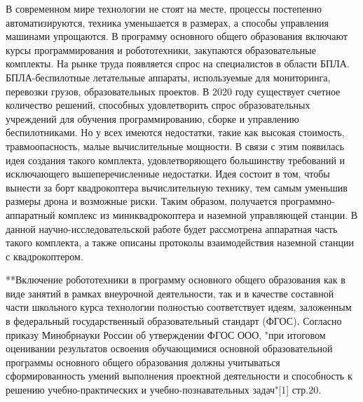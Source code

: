 В современном мире технологии не стоят на месте, процессы постепенно автоматизируются, техника уменьшается в размерах, а способы управления машинами упрощаются. В программу основного общего образования включают курсы программирования и робототехники, закупаются образовательные комплекты. На рынке труда появляется спрос на специалистов в области БПЛА. БПЛА-беспилотные летательные аппараты, используемые для мониторинга, перевозки грузов, образовательных проектов. В 2020 году существует счетное количество решений, способных удовлетворить спрос образовательных учреждений для обучения программированию, сборке и управлению беспилотниками. Но у всех имеются недостатки, такие как высокая стоимость, травмоопасность, малые вычислительные мощности. В связи с этим появилась идея создания такого комплекта, удовлетворяющего большинству требований и исключающего вышеперечисленные недостатки. Идея состоит в том, чтобы вынести за борт квадрокоптера вычислительную технику, тем самым уменьшив размеры дрона и возможные риски. Таким образом, получается программно-аппаратный комплекс из миниквадрокоптера и наземной управляющей станции. 
В данной научно-исследовательской работе будет рассмотрена аппаратная часть такого комплекта, а также описаны протоколы взаимодействия наземной станции с квадрокоптером.


**Включение робототехники в программу основного общего образования как в виде занятий в рамках внеурочной деятельности, так и в качестве составной части школьного курса технологии полностью соответствует идеям, заложенным в федеральный государственный образовательный стандарт (ФГОС). Согласно приказу Минобрнауки России об утверждении ФГОС ООО, "при итоговом оценивании результатов освоения обучающимися основной образовательной программы основного общего образования должны учитываться сформированность умений выполнения проектной деятельности и способность к решению учебно-практических и учебно-познавательных задач"[1] стр.20.

